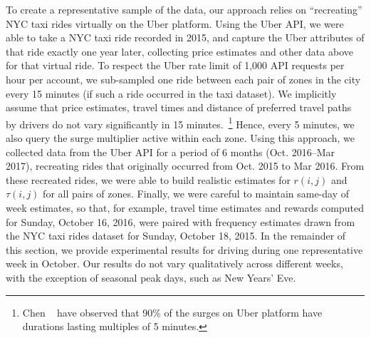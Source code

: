 To create a representative sample of the data, our approach relies on ``recreating'' NYC taxi rides virtually on the Uber platform. 
Using the Uber API, we were able to take a NYC taxi ride recorded in 2015, and capture the Uber attributes of that ride exactly 
one year later, collecting price estimates and other data above for that virtual ride.
To respect the Uber rate limit of 1,000 API requests per hour per account, we sub-sampled one ride between each pair of zones in
the city every 15 minutes (if such a ride occurred in the taxi dataset).
We implicitly assume that price estimates, travel times and distance of preferred travel paths by drivers do not vary 
significantly in 15 minutes.~\footnote{Chen {\etal}~\cite{chen2015peeking} have observed that 90\% of the surges on Uber platform 
have durations lasting multiples of 5 minutes.} Hence, every 5 minutes, we also query the surge multiplier active within each zone.
Using this approach, we collected data from the Uber API for a period of 6 months (Oct. 2016--Mar 2017), 
recreating rides that originally occurred from 
Oct. 2015 to Mar 2016.   From these recreated rides, we were able to build realistic estimates for $r(i,j)$ and $\tau(i,j)$
for all pairs of zones.  Finally, we were careful to maintain same-day of week estimates, so that, for example, travel time estimates
and rewards computed for Sunday, October 16, 2016, were paired with frequency estimates drawn from the NYC taxi rides dataset for
Sunday, October 18, 2015.
In the remainder of this section, we provide experimental results for driving during one representative week in October.
Our results do not vary qualitatively across different weeks, with the exception of seasonal peak days, such as New Years' Eve. 

%

